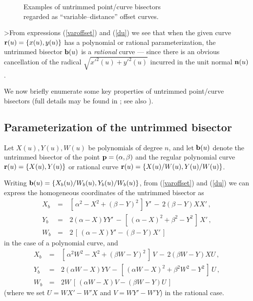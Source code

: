 \begin{figure}[htbp] \vspace{3in}
\caption[]{Examples of untrimmed point/curve bisectors \\
regarded as ``variable--distance'' offset curves. }
\label{fig:varoffset} \end{figure}

\begin{rmk} {\rm
>From expressions (\ref{varoffset}) and (\ref{du}) we see
that when the given curve ${\bf r}(u)=\{x(u),y(u)\}$ has a
polynomial or rational parameterization, the untrimmed bisector
${\bf b}(u)$ is a {\it rational\/} curve --- since there is an
obvious cancellation of the radical $\sqrt{{x'}^2(u)+{y'}^2(u)}$
incurred in the unit normal ${\bf n}(u)$. }
\end{rmk}

We now briefly enumerate some key properties of untrimmed
point/curve bisectors (full details may be found in \cite
{farouki91}; see also \cite{field92}).

\subsection{Parameterization of the untrimmed bisector}

Let $X(u),Y(u),W(u)$ be polynomials of degree $n$, and let
${\bf b}(u)$ denote the untrimmed bisector of the point ${\bf p}
=(\alpha,\beta)$ and the regular polynomial curve ${\bf r}(u)=
\{X(u),Y(u)\}$ or rational curve ${\bf r}(u)=\{X(u)/W(u),
Y(u)/W(u)\}$.

Writing ${\bf b}(u)=\{X_b(u)/W_b(u),Y_b(u)/W_b(u)\}$, from
(\ref{varoffset}) and (\ref{du}) we can express the homogeneous
coordinates of the untrimmed bisector as
\begin{eqnarray} \label{pbsctr}
X_b &\,=\,& [\,\alpha^2-X^2+(\beta-Y)^2\,]\,Y'
 \,-\, 2(\beta-Y)XX' \,, \nonumber \\
Y_b &\,=\,& 2(\alpha-X)YY'
 \,-\, [\,(\alpha-X)^2+\beta^2-Y^2\,]\,X' \,, \nonumber \\
W_b &\,=\,& 2\,[\,(\alpha-X)Y'-(\beta-Y)X'\,]
\end{eqnarray}
in the case of a polynomial curve, and
\begin{eqnarray} \label{rbsctr}
X_b &\,=\,& [\,\alpha^2W^2-X^2+(\beta W-Y)^2\,]\,V
 \,-\, 2(\beta W-Y)XU \,, \nonumber \\
Y_b &\,=\,& 2(\alpha W-X)YV
 \,-\, [\,(\alpha W-X)^2+\beta^2W^2-Y^2\,]\,U \,, \nonumber \\
W_b &\,=\,& 2W\,[\,(\alpha W-X)V-(\beta W-Y)U\,]
\end{eqnarray}
(where we set $U=WX'-W'X$ and $V=WY'-W'Y$) in the rational case.

